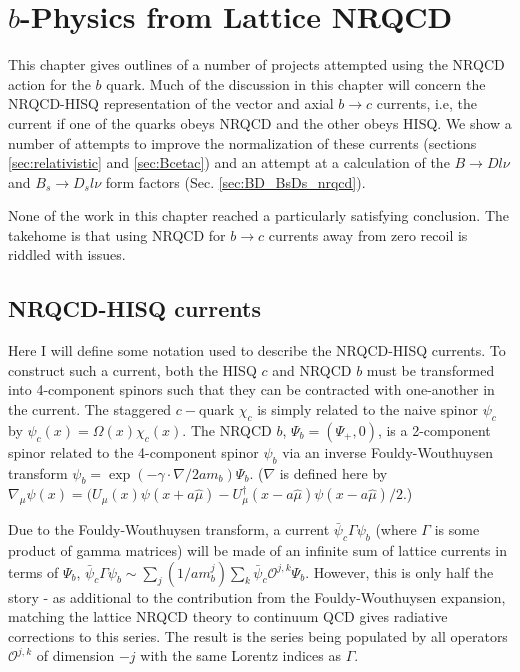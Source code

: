 ﻿\chapter{$b$-Physics from Lattice NRQCD}
\label{chap:nrqcd}

This chapter gives outlines of a number of projects attempted using the NRQCD action for the $b$ quark. Much of the discussion in this chapter will concern the NRQCD-HISQ representation of the vector and axial $b\to c$ currents, i.e, the current if one of the quarks obeys NRQCD and the other obeys HISQ. We show a number of attempts to improve the normalization of these currents (sections \ref{sec:relativistic} and \ref{sec:Bcetac}) and an attempt at a calculation of the $B\to Dl\nu$ and $B_s\to D_s l\nu$ form factors (Sec. \ref{sec:BD_BsDs_nrqcd}).

None of the work in this chapter reached a particularly satisfying conclusion. The takehome is that using NRQCD for $b \to c$ currents away from zero recoil is riddled with issues.

\section{NRQCD-HISQ currents}

Here I will define some notation used to describe the NRQCD-HISQ currents. To construct such a current, both the HISQ $c$ and NRQCD $b$ must be transformed into 4-component spinors such that they can be contracted with one-another in the current. The staggered $c-$quark $\chi_c$ is simply related to the naive spinor $\psi_c$ by $\psi_c(x)=\Omega(x) \chi_c(x)$. The NRQCD $b$, $\Psi_{b} = ( \Psi_+, 0 )$, is a 2-component spinor related to the 4-component spinor $\psi_b$ via an inverse Fouldy-Wouthuysen transform $\psi_b = \exp( - \gamma\cdot \nabla / 2am_b )\Psi_b$. ($\nabla$ is defined here by $\nabla_{\mu} \psi(x) = (U_{\mu}(x)\psi(x+a\hat{\mu})-U^{\dagger}_{\mu}(x-a\hat{\mu})\psi(x-a\hat{\mu})/2$.)

Due to the Fouldy-Wouthuysen transform, a current $\bar{\psi}_c \Gamma \psi_b$ (where $\Gamma$ is some product of gamma matrices) will be made of an infinite sum of lattice currents in terms of $\Psi_b$, $\bar{\psi}_c \Gamma \psi_b \sim \sum_j (1/am_b^j) \sum_k \bar{\psi}_c \mathcal{O}^{j,k} \Psi_b$. However, this is only half the story - as additional to the contribution from the Fouldy-Wouthuysen expansion, matching the lattice NRQCD theory to continuum QCD gives radiative corrections to this series. The result is the series being populated by all operators $\mathcal{O}^{j,k}$ of dimension $-j$ with the same Lorentz indices as $\Gamma$. 

